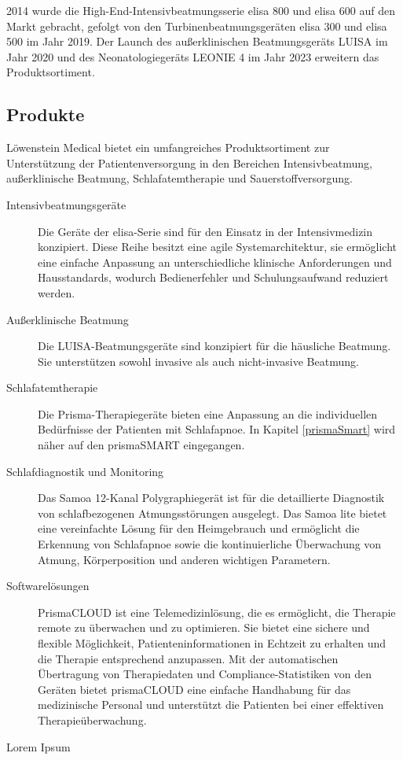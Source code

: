 \documentclass[a4paper, 12pt]{article}
\begin{document}
2014 wurde die High-End-Intensivbeatmungsserie elisa 800 und elisa 600 auf den Markt gebracht, gefolgt von den Turbinenbeatmungsgeräten elisa 300 und elisa 500 im Jahr 2019. Der Launch des außerklinischen Beatmungsgeräts LUISA im Jahr 2020 und des Neonatologiegeräts LEONIE 4 im Jahr 2023 erweitern das Produktsortiment. \cite{loewenstein}

\subsection{Produkte}\label{products} 
Löwenstein Medical bietet ein umfangreiches Produktsortiment zur Unterstützung der Patientenversorgung in den Bereichen Intensivbeatmung, außerklinische Beatmung, Schlafatemtherapie und Sauerstoffversorgung. 

\begin{description}
	\item[Intensivbeatmungsgeräte] Die Geräte der elisa-Serie sind für den Einsatz in der Intensivmedizin konzipiert. Diese Reihe besitzt eine agile Systemarchitektur, sie ermöglicht eine einfache Anpassung an unterschiedliche klinische Anforderungen und Hausstandards, wodurch Bedienerfehler und Schulungsaufwand reduziert werden. \\

	\item[Außerklinische Beatmung] Die LUISA-Beatmungsgeräte sind konzipiert für die häusliche Beatmung. Sie unterstützen sowohl invasive als auch nicht-invasive Beatmung. \\

	\item[Schlafatemtherapie] Die Prisma-Therapiegeräte bieten eine Anpassung an die individuellen Bedürfnisse der Patienten mit Schlafapnoe. In Kapitel \ref{prismaSmart} wird näher auf den prismaSMART eingegangen. \\

	\item[Schlafdiagnostik und Monitoring] Das Samoa 12-Kanal Polygraphiegerät ist für die detaillierte Diagnostik von schlafbezogenen Atmungsstörungen ausgelegt. Das Samoa lite bietet eine vereinfachte Lösung für den Heimgebrauch und ermöglicht die Erkennung von Schlafapnoe sowie die kontinuierliche Überwachung von Atmung, Körperposition und anderen wichtigen Parametern. \\

	\item[Softwarelösungen] PrismaCLOUD ist eine Telemedizinlösung, die es ermöglicht, die Therapie remote zu überwachen und zu optimieren. Sie bietet eine sichere und flexible Möglichkeit, Patienteninformationen in Echtzeit zu erhalten und die Therapie entsprechend anzupassen. Mit der automatischen Übertragung von Therapiedaten und Compliance-Statistiken von den Geräten bietet prismaCLOUD eine einfache Handhabung für das medizinische Personal und unterstützt die Patienten bei einer effektiven Therapieüberwachung.

	\item[Lorem Ipsum]
\end{description}
\end{document}
